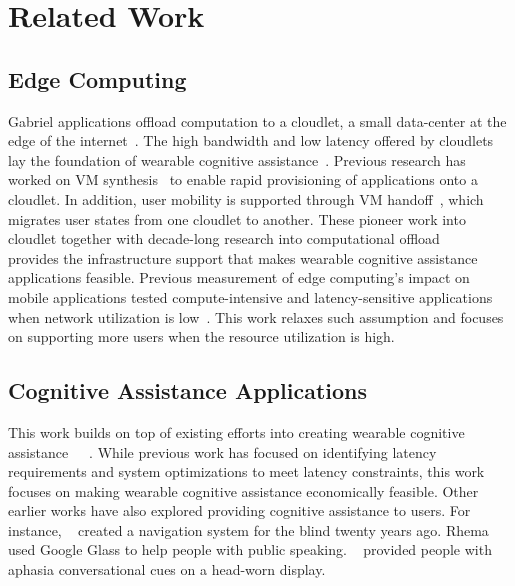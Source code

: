 {\let\clearpage\relax \section{Related Work}}

\subsection{Edge Computing}

Gabriel applications offload computation to a cloudlet, a small data-center at
the edge of the internet~\cite{satyanarayanan2009case}. The high bandwidth and
low latency offered by cloudlets~\cite{ha2013impact}~\cite{hu2016quantifying}
lay the foundation of wearable cognitive assistance~\cite{ha2014towards}.
Previous research has worked on VM synthesis~\cite{ha2013just} to enable rapid
provisioning of applications onto a cloudlet. In addition, user mobility is
supported through VM handoff~\cite{ha2017you}, which migrates user states from
one cloudlet to another. These pioneer work into cloudlet together with
decade-long research into computational
offload~\cite{cuervo2010maui}~\cite{gordon2012comet}~\cite{flinn2012cyber}
provides the infrastructure support that makes wearable cognitive assistance
applications feasible. Previous measurement of edge computing's impact on mobile
applications tested compute-intensive and latency-sensitive applications when
network utilization is low~\cite{chen2017empirical}. This work relaxes such assumption and
focuses on supporting more users when the resource utilization is high.

\subsection{Cognitive Assistance Applications}
This work builds on top of existing efforts into creating wearable cognitive
assistance~\cite{ha2014towards}~\cite{chen2015early}~\cite{chen2017empirical}.
While previous work has focused on identifying latency requirements and system
optimizations to meet latency constraints, this work focuses on making wearable
cognitive assistance economically feasible. Other earlier works have also
explored providing cognitive assistance to users. For instance,
~\cite{loomis1998navigation} created a navigation system for the blind twenty
years ago. Rhema~\cite{tanveer2015rhema} used Google Glass to help people with
public speaking. ~\cite{williams2015designing} provided people with aphasia
conversational cues on a head-worn display.

